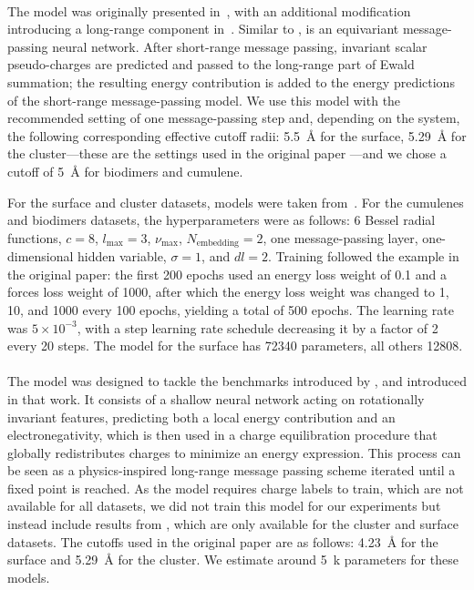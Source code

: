 \documentclass[10pt]{article}
\begin{document}
\paragraph{\cace}
The \cace model was originally presented in~\cite{c2024}, with an additional modification introducing a long-range component in~\cite{c2025}. Similar to \mace, \cace is an equivariant message-passing neural network. After short-range message passing, invariant scalar pseudo-charges are predicted and passed to the long-range part of Ewald summation; the resulting energy contribution is added to the energy predictions of the short-range message-passing model. We use this model with the recommended setting of one message-passing step and, depending on the system, the following corresponding effective cutoff radii: \qty{5.5}{\angstrom} for the  surface, \qty{5.29}{\angstrom} for the  cluster—these are the settings used in the original paper \cite{kkzc2024}—and we chose a cutoff of \qty{5}{\angstrom} for biodimers and cumulene.

For the  surface and  cluster datasets, models were taken from~\cite{kkzc2024}. For the cumulenes and biodimers datasets, the hyperparameters were as follows: 6 Bessel radial functions, $c = 8$, $l_{\text{max}} = 3$, $\nu_{\text{max}}$, $N_{\text{embedding}} = 2$, one message-passing layer, one-dimensional hidden variable, $\sigma = 1$, and $dl = 2$. Training followed the example in the original paper: the first 200 epochs used an energy loss weight of 0.1 and a forces loss weight of 1000, after which the energy loss weight was changed to 1, 10, and 1000 every 100 epochs, yielding a total of 500 epochs. The learning rate was $5 \times 10^{-3}$, with a step learning rate schedule decreasing it by a factor of 2 every 20 steps. The model for the  surface has \num{72340} parameters, all others \num{12808}.


\paragraph{\fgnn}
The \fgnn model was designed to tackle the benchmarks introduced by \cite{kfgb2021}, and introduced in that work. It consists of a shallow neural network acting on rotationally invariant features, predicting both a local energy contribution and an electronegativity, which is then used in a charge equilibration procedure that globally redistributes charges to minimize an energy expression. This process can be seen as a physics-inspired long-range message passing scheme iterated until a fixed point is reached. 
% 
As the model requires charge labels to train, which are not available for all datasets, we did not train this model for our experiments but instead include results from \citet{kfgb2021}, which are only available for the  cluster and  surface datasets. The cutoffs used in the original paper are as follows: \qty{4.23}{\angstrom} for the  surface and \qty{5.29}{\angstrom} for the  cluster. We estimate around \qty{5}{k} parameters for these models.
\end{document}
